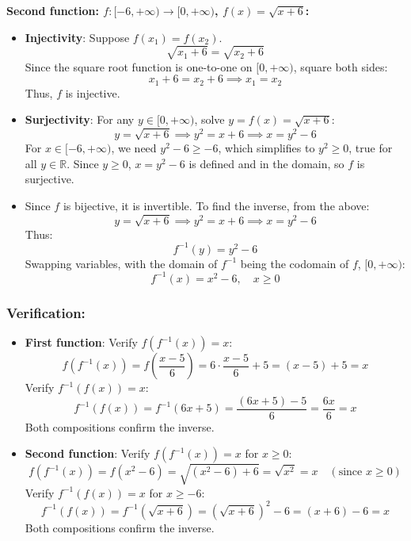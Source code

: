 \documentclass[12pt, a4paper, twoside]{report} %
\begin{document}
\textbf{Second function: \( f: [-6, +\infty) \rightarrow [0, +\infty) \), \( f(x) = \sqrt{x + 6} \):}
\begin{itemize}
  \item \textbf{Injectivity}: Suppose \( f(x_1) = f(x_2) \).
    \[
    \sqrt{x_1 + 6} = \sqrt{x_2 + 6}
    \]
    Since the square root function is one-to-one on \( [0, +\infty) \), square both sides:
    \[
    x_1 + 6 = x_2 + 6 \implies x_1 = x_2
    \]
    Thus, \( f \) is injective.
  \item \textbf{Surjectivity}: For any \( y \in [0, +\infty) \), solve \( y = f(x) = \sqrt{x + 6} \):
    \[
    y = \sqrt{x + 6} \implies y^2 = x + 6 \implies x = y^2 - 6
    \]
    For \( x \in [-6, +\infty) \), we need \( y^2 - 6 \geq -6 \), which simplifies to \( y^2 \geq 0 \), true for all \( y \in \mathbb{R} \). Since \( y \geq 0 \), \( x = y^2 - 6 \) is defined and in the domain, so \( f \) is surjective.
  \item Since \( f \) is bijective, it is invertible. To find the inverse, from the above:
    \[
    y = \sqrt{x + 6} \implies y^2 = x + 6 \implies x = y^2 - 6
    \]
    Thus:
    \[
    f^{-1}(y) = y^2 - 6
    \]
    Swapping variables, with the domain of \( f^{-1} \) being the codomain of \( f \), \( [0, +\infty) \):
    \[
    f^{-1}(x) = x^2 - 6, \quad x \geq 0
    \]
\end{itemize}

\subsubsection*{Verification:}
\begin{itemize}
  \item \textbf{First function}: Verify \( f(f^{-1}(x)) = x \):
    \[
    f(f^{-1}(x)) = f\left( \frac{x - 5}{6} \right) = 6 \cdot \frac{x - 5}{6} + 5 = (x - 5) + 5 = x
    \]
    Verify \( f^{-1}(f(x)) = x \):
    \[
    f^{-1}(f(x)) = f^{-1}(6x + 5) = \frac{(6x + 5) - 5}{6} = \frac{6x}{6} = x
    \]
    Both compositions confirm the inverse.
  \item \textbf{Second function}: Verify \( f(f^{-1}(x)) = x \) for \( x \geq 0 \):
    \[
    f(f^{-1}(x)) = f(x^2 - 6) = \sqrt{(x^2 - 6) + 6} = \sqrt{x^2} = x \quad (\text{since } x \geq 0)
    \]
    Verify \( f^{-1}(f(x)) = x \) for \( x \geq -6 \):
    \[
    f^{-1}(f(x)) = f^{-1}(\sqrt{x + 6}) = (\sqrt{x + 6})^2 - 6 = (x + 6) - 6 = x
    \]
    Both compositions confirm the inverse.
\end{itemize}
\end{document}
